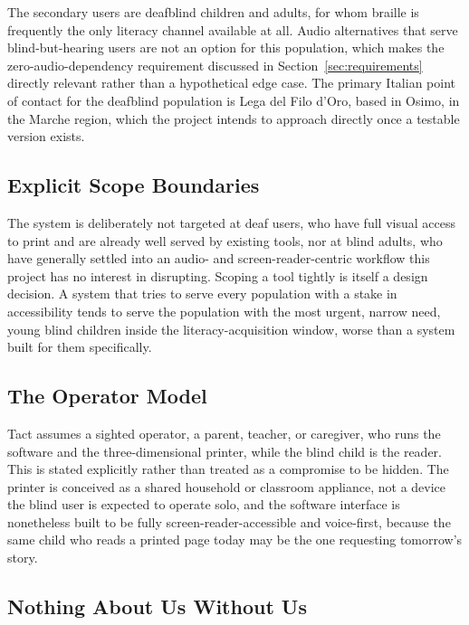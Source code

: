 \documentclass[conference]{IEEEtran}
\begin{document}
The secondary users are deafblind children and adults, for whom braille is frequently the only literacy channel available at all. Audio alternatives that serve blind-but-hearing users are not an option for this population, which makes the zero-audio-dependency requirement discussed in Section~\ref{sec:requirements} directly relevant rather than a hypothetical edge case. The primary Italian point of contact for the deafblind population is Lega del Filo d'Oro, based in Osimo, in the Marche region, which the project intends to approach directly once a testable version exists.

\subsection{Explicit Scope Boundaries}

The system is deliberately not targeted at deaf users, who have full visual access to print and are already well served by existing tools, nor at blind adults, who have generally settled into an audio- and screen-reader-centric workflow this project has no interest in disrupting. Scoping a tool tightly is itself a design decision. A system that tries to serve every population with a stake in accessibility tends to serve the population with the most urgent, narrow need, young blind children inside the literacy-acquisition window, worse than a system built for them specifically.

\subsection{The Operator Model}

Tact assumes a sighted operator, a parent, teacher, or caregiver, who runs the software and the three-dimensional printer, while the blind child is the reader. This is stated explicitly rather than treated as a compromise to be hidden. The printer is conceived as a shared household or classroom appliance, not a device the blind user is expected to operate solo, and the software interface is nonetheless built to be fully screen-reader-accessible and voice-first, because the same child who reads a printed page today may be the one requesting tomorrow's story.

\subsection{Nothing About Us Without Us}
\end{document}
